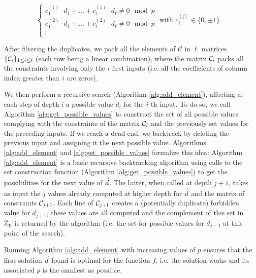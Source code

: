 $$
\begin{cases}
    c_1^{(1)} \cdot d_1 + \dots + c_l^{(1)} \cdot d_\ell \ne 0 \mod p \\
    c_1^{(2)} \cdot d_1 + \dots + c_l^{(2)} \cdot d_\ell \ne 0 \mod p\\
    \vdots
\end{cases} \text{ with }
c_i^{(j)} \in \{0, \pm 1\}
$$


After filtering the duplicates, we pack all the elements of $\mathcal{C}$ in $\ell$ matrices $\{\mathcal C_i\}_{1 \le i \le \ell}$ (each row being a linear combination), where the matrix $\mathcal C_i$ packs all the constraints involving only the $i$ first inputs (i.e. all the coefficients of column index greater than $i$ are zeros).


We then perform a recursive search (Algorithm \ref{alg:add_element}), affecting at each step of depth $i$ a possible value $d_i$ for the $i$-th input. To do so, we call Algorithm \ref{alg:get_possible_values} to construct the set of all possible values complying with the constraints of the matrix $\mathcal C_i$ and the previously set values for the preceding inputs. If we reach a dead-end, we backtrack by deleting the previous input and assigning it the next possible value. Algorithms \ref{alg:add_element} and \ref{alg:get_possible_values} formalize this idea: Algorithm \ref{alg:add_element} is a  basic recursive backtracking algorithm using calls to the set construction function (Algorithm \ref{alg:get_possible_values}) to get the possibilities for the next value of $\vec{d}$. The latter, when called at depth $j+1$, takes as input the 
$j$ values already computed at higher depth for $\vec{d}$ and the matrix of constraints $\mathcal C_{j+1}$. Each line of $\mathcal C_{j+1}$ creates a (potentially duplicate) forbidden value for $d_{j+1}$, these values are all computed and the complement of this set in $\mathbb{Z}_p$ is returned by the algorithm (i.e. the set for possible values for $d_{j+1}$ at this point of the search).

\begin{theorem}
     Running Algorithm \ref{alg:add_element} with increasing values of $p$ ensures that the first solution $\vec d$ found is optimal for the function $f$, i.e. the solution works and its associated $p$ is the smallest as possible.   
\end{theorem}






